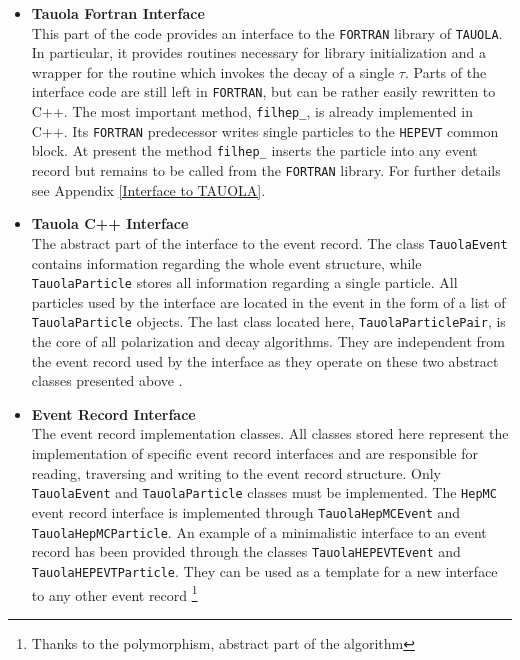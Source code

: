 \documentclass[]{Tauola_interface_design}
\begin{document}
\begin{itemize}
  \item {\bf Tauola Fortran Interface}\\
       This part of the code provides an interface 
       to the  {\tt FORTRAN} library of {\tt TAUOLA}. In particular,  it provides routines
       necessary for library initialization and a wrapper for the routine which invokes the decay of a single 
       $\tau$. Parts of the interface code are still left in  {\tt FORTRAN}, but  can be rather easily
       rewritten to C++. 
       The most important method, {\tt filhep\_},
       is already implemented  in C++. Its  {\tt FORTRAN} predecessor writes single particles to
       the {\tt HEPEVT} common block. At present the method {\tt filhep\_} inserts the particle 
       into any event record but remains to be called from the  {\tt FORTRAN} library.
       For further details see Appendix \ref{Interface to TAUOLA}.
  \item {\bf Tauola C++ Interface} \\
       The abstract part of the interface to the event record.
       The class {\tt TauolaEvent} contains information regarding the whole event
       structure, while {\tt TauolaParticle} stores all information regarding a single particle.
       All particles used by the interface are located in the event in the form of
       a list of {\tt TauolaParticle} objects.
       The last class located here, {\tt TauolaParticlePair}, is the core of all polarization
       and decay algorithms. They are independent from the event record used by the interface
       as they operate on these two abstract classes presented above%
       .
  \item {\bf Event Record Interface} \\
       The event record implementation classes. All classes stored here represent
       the implementation of specific event record interfaces and are responsible for reading,
       traversing and writing to the event record structure.
       Only {\tt TauolaEvent} and {\tt TauolaParticle} classes must be implemented.
       The {\tt HepMC} event record interface is implemented
       through {\tt TauolaHepMCEvent} and {\tt TauolaHepMCParticle}.
       An example of a minimalistic interface to an event record has been provided
       through the classes {\tt TauolaHEPEVTEvent} and {\tt TauolaHEPEVTParticle}.
       They can be used as a template for a new interface to any other event record%
       \footnote{Thanks to the polymorphism, abstract part of the algorithm
}
\end{itemize}
\end{document}
